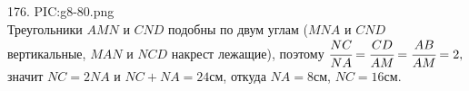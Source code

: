 176. {{PIC:g8-80.png}}\\
Треугольники $AMN$ и $CND$ подобны по двум углам ($MNA$ и $CND$ вертикальные, $MAN$ и $NCD$ накрест лежащие), поэтому $\cfrac{NC}{NA}=\cfrac{CD}{AM}=\cfrac{AB}{AM}=2,$ значит $NC=2NA$ и $NC+NA=24$см, откуда $NA=8$см, $NC=16$см.\newpage\noindent
